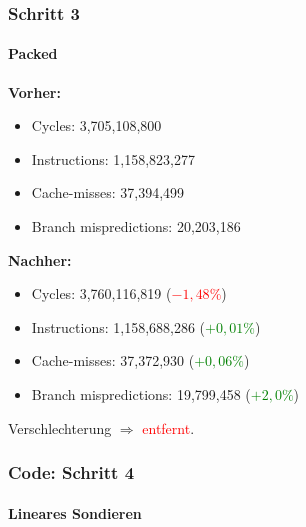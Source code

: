 \documentclass{beamer}
\newcommand{\success}[1]{\textcolor{green}{#1}}
\newcommand{\fail}[1]{\textcolor{red}{#1}}
\begin{document}
  \begin{frame}
  	\frametitle{Schritt 3}
  	\framesubtitle{Packed}
  	\textbf{Vorher:}
  	\begin{itemize}
			\item Cycles: 3,705,108,800 \\
			\item Instructions: 1,158,823,277\\
			\item Cache-misses: 37,394,499\\
			\item Branch mispredictions: 20,203,186\\
		\end{itemize}

		\textbf{Nachher:}
		\begin{itemize}
			\item Cycles: 3,760,116,819 (\fail{$- 1,48 \%$})\\
			\item Instructions: 1,158,688,286 (\success{$+ 0,01\%$})\\
			\item Cache-misses: 37,372,930 (\success{$+ 0,06 \%$})\\
			\item Branch mispredictions: 19,799,458 (\success{$+ 2,0\%$})\\
		\end{itemize}
		Verschlechterung $\Rightarrow$ \fail{entfernt}.
  \end{frame}

  \begin{frame}
  	\frametitle{Code: Schritt 4}
  	\framesubtitle{Lineares Sondieren}
		\sLinear
  \end{frame}
\end{document}
